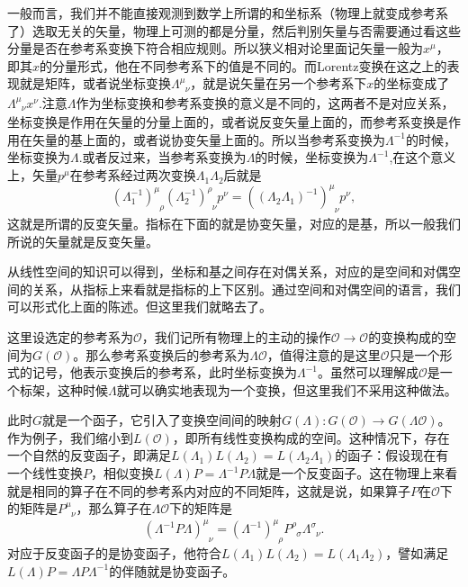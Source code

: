 \documentclass[9pt]{extbook}
\begin{document}
一般而言，我们并不能直接观测到数学上所谓的和坐标系（物理上就变成参考系了）选取无关的矢量，物理上可测的都是分量，然后判别矢量与否需要通过看这些分量是否在参考系变换下符合相应规则。所以狭义相对论里面记矢量一般为$x^\mu$，即其$x$的分量形式，他在不同参考系下的值是不同的。而Lorentz变换在这之上的表现就是矩阵，或者说坐标变换$\Lambda^\mu_{\phantom{\mu}\nu}$，就是说矢量在另一个参考系下$x$的坐标变成了$\Lambda^\mu_{\phantom{\mu}\nu}x^\nu$.注意$\Lambda$作为坐标变换和参考系变换的意义是不同的，这两者不是对应关系，坐标变换是作用在矢量的分量上面的，或者说反变矢量上面的，而参考系变换是作用在矢量的基上面的，或者说协变矢量上面的。所以当参考系变换为$\Lambda^{-1}$的时候，坐标变换为$\Lambda$.或者反过来，当参考系变换为$\Lambda$的时候，坐标变换为$\Lambda^{-1}$,在这个意义上，矢量$p^\mu$在参考系经过两次变换$\Lambda_1\Lambda_2$后就是
\[
(\Lambda_1^{-1})^\mu_{\phantom{\mu}\rho}(\Lambda_2^{-1})^\rho_{\phantom{\rho}\nu}p^\nu=((\Lambda_2\Lambda_1)^{-1})^\mu_{\phantom{\mu}\nu}p^\nu,
\]
这就是所谓的反变矢量。指标在下面的就是协变矢量，对应的是基，所以一般我们所说的矢量就是反变矢量。

从线性空间的知识可以得到，坐标和基之间存在对偶关系，对应的是空间和对偶空间的关系，从指标上来看就是指标的上下区别。通过空间和对偶空间的语言，我们可以形式化上面的陈述。但这里我们就略去了。

这里设选定的参考系为$\mathcal{O}$，我们记所有物理上的主动的操作$\mathcal{O}\to \mathcal{O}$的变换构成的空间为$G(\mathcal{O})$。那么参考系变换后的参考系为$\Lambda \mathcal{O}$，值得注意的是这里$\mathcal{O}$只是一个形式的记号，他表示变换后的参考系，此时坐标变换为$\Lambda^{-1}$。虽然可以理解成$\mathcal{O}$是一个标架，这种时候$\Lambda$就可以确实地表现为一个变换，但这里我们不采用这种做法。

此时$G$就是一个函子，它引入了变换空间间的映射$G(\Lambda):G(\mathcal{O})\to G(\Lambda\mathcal{O})$。作为例子，我们缩小到$L(\mathcal{O})$，即所有线性变换构成的空间。这种情况下，存在一个自然的反变函子，即满足$L(\Lambda_1)L(\Lambda_2)=L(\Lambda_2 \Lambda_1)$的函子：假设现在有一个线性变换$P$，相似变换$L(\Lambda)P=\Lambda^{-1} P \Lambda$就是一个反变函子。这在物理上来看就是相同的算子在不同的参考系内对应的不同矩阵，这就是说，如果算子$P$在$\mathcal{O}$下的矩阵是$P^\mu_{\phantom{\mu}\nu}$，那么算子在$\Lambda\mathcal{O}$下的矩阵是
\[
(\Lambda^{-1} P\Lambda)^\mu_{\phantom{\mu}\nu}=(\Lambda^{-1})^\mu_{\phantom{\mu}\rho}P^\rho_{\phantom{\rho}\sigma}\Lambda^\sigma_{\phantom{\sigma}\nu}.
\]
对应于反变函子的是协变函子，他符合$L(\Lambda_1)L(\Lambda_2)=L(\Lambda_1 \Lambda_2)$，譬如满足$L(\Lambda)P=\Lambda P \Lambda^{-1}$的伴随就是协变函子。
\end{document}
